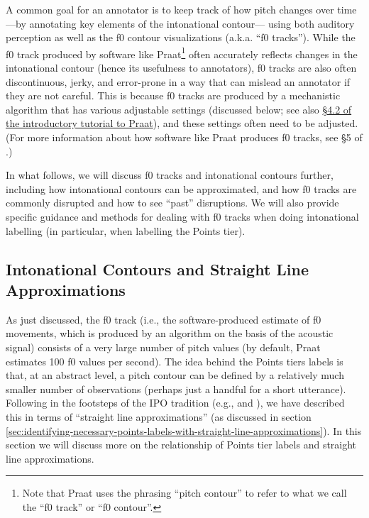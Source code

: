 \documentclass[11pt, twoside]{memoir}
\begin{document}
A common goal for an annotator is to keep track of how pitch changes over time —by annotating key elements of the intonational contour— using both auditory perception as well as the f0 contour visualizations (a.k.a. “f0 tracks”). While the f0 track produced by software like Praat\footnote{Note that Praat uses the phrasing “pitch contour” to refer to what we call the “f0 track” or “f0 contour”.} often accurately reflects changes in the intonational contour (hence its usefulness to annotators), f0 tracks are also often discontinuous, jerky, and error-prone in a way that can mislead an annotator if they are not careful. This is because f0 tracks are produced by a mechanistic algorithm that has various adjustable settings (discussed below; see also \href{https://www.fon.hum.uva.nl/praat/manual/Intro_4_2__Configuring_the_pitch_contour.html}{§4.2 of the introductory tutorial to Praat}), and these settings often need to be adjusted. (For more information about how software like Praat produces f0 tracks, see §5 of \citealt{weenink20}.)

In what follows, we will discuss f0 tracks and intonational contours further, including how intonational contours can be approximated, and how f0 tracks are commonly disrupted and how to see “past” disruptions. We will also provide specific guidance and methods for dealing with f0 tracks when doing intonational labelling (in particular, when labelling the Points tier).


\subsection{Intonational Contours and Straight Line Approximations}\label{sec:intonational-contours-and-straight-line-approximations}

As just discussed, the f0 track (i.e., the software-produced estimate of f0 movements, which is produced by an algorithm on the basis of the acoustic signal) consists of a very large number of pitch values (by default, Praat estimates 100 f0 values per second). The idea behind the Points tiers labels is that, at an abstract level, a pitch contour can be defined by a relatively much smaller number of observations (perhaps just a handful for a short utterance). Following in the footsteps of the IPO tradition (e.g., \citealt{t-hartcollier75} and \citealt{t-hart-90}), we have described this in terms of “straight line approximations” (as discussed in section \ref{sec:identifying-necessary-points-labels-with-straight-line-approximations}). In this section we will discuss more on the relationship of Points tier labels and straight line approximations.
\end{document}
